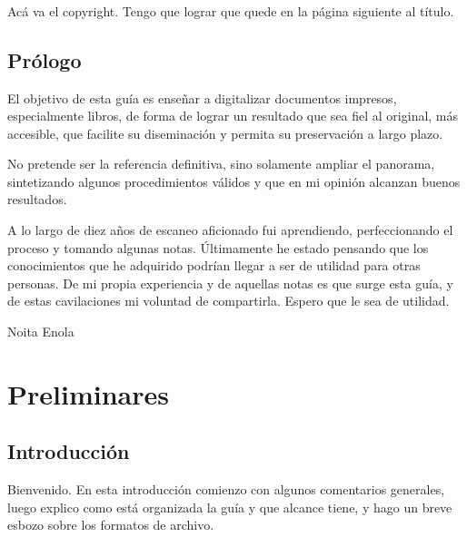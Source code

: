 \documentclass[%
	a5paper,
	10pt,
	twoside,
	openright,
	final,
]{memoir}
\title{\documentTitle\\\documentVersion}
\author{\documentAuthor\\\documentURL}
\begin{document}
%
	\frontmatter

	\titleTH\thispagestyle{empty}

	Acá va el copyright. Tengo que lograr que quede en la página siguiente al título.

	\vspace{4\onelineskip}
	\license\cleardoublepage

	\chapter{Prólogo} El objetivo de esta guía es enseñar a digitalizar documentos impresos, especialmente libros, de forma de lograr un resultado que sea fiel al original, más accesible, que facilite su diseminación y permita su preservación a largo plazo.

	No pretende ser la referencia definitiva, sino solamente ampliar el panorama, sintetizando algunos procedimientos válidos y que en mi opinión alcanzan buenos resultados.

	A lo largo de diez años de escaneo aficionado fui aprendiendo, perfeccionando el proceso y tomando algunas notas. Últimamente he estado pensando que los conocimientos que he adquirido podrían llegar a ser de utilidad para otras personas. De mi propia experiencia y de aquellas notas es que surge esta guía, y de estas cavilaciones mi voluntad de compartirla. Espero que le sea de utilidad.

	{\raggedleft Noita Enola\par}

	\tableofcontents\cleardoublepage

	\mainmatter

	\part{Preliminares}

	\chapter{Introducción} Bienvenido. En esta introducción comienzo con algunos comentarios generales, luego explico como está organizada la guía y que alcance tiene, y hago un breve esbozo sobre los formatos de archivo.
\end{document}
